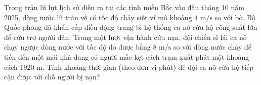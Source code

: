 \begin{ex}%
	Trong trận lũ lụt lịch sử diễn ra tại các tỉnh miền Bắc vào đầu tháng 10 năm 2025, dòng nước lũ tràn về có tốc độ chảy siết vĩ mô khoảng $4\text{ m/s}$ so với bờ. Bộ Quốc phòng đã khẩn cấp điều động trang bị hệ thống ca nô cứu hộ công suất lớn để cứu trợ người dân. Trong một lượt vận hành cứu nạn, đội chiến sĩ lái ca nô chạy ngược dòng nước với tốc độ đo được bằng $8\text{ m/s}$ so với dòng nước chảy để tiến đến một mái nhà đang có người mắc kẹt cách trạm xuất phát một khoảng cách $1920\text{ m}$. Tính khoảng thời gian (theo đơn vị phút) để đội ca nô cứu hộ tiếp cận được tới chỗ người bị nạn?
\end{ex}

